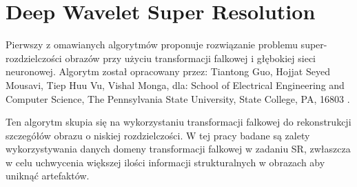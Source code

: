 \chapter{Deep Wavelet Super Resolution} \label{chap:DWSR}


Pierwszy z omawianych algorytmów proponuje rozwiązanie problemu super-rozdzielczości obrazów przy użyciu transformacji falkowej i głębokiej sieci neuronowej. Algorytm został opracowany przez: Tiantong Guo, Hojjat Seyed Mousavi, Tiep Huu Vu, Vishal Monga, dla: School of Electrical Engineering and Computer Science, The Pennsylvania State University, State College, PA, 16803 \cite{guo2017deep}.

Ten algorytm skupia się na wykorzystaniu transformacji falkowej do rekonstrukcji szczegółów obrazu o niskiej rozdzielczości.
W tej pracy badane są zalety wykorzystywania danych domeny transformacji falkowej w zadaniu SR, zwłaszcza w celu uchwycenia większej ilości informacji strukturalnych w obrazach aby uniknąć artefaktów. 

